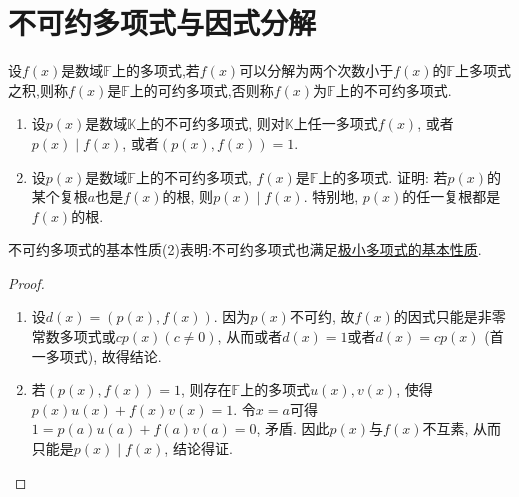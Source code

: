 \documentclass[../../main.tex]{subfiles}
\begin{document}
\section{不可约多项式与因式分解}

\begin{definition}[不可约多项式的定义]\label{definition:不可约多项式的定义}
设\(f(x)\)是数域\(\mathbb{F}\)上的多项式,若\(f(x)\)可以分解为两个次数小于\(f(x)\)的\(\mathbb{F}\)上多项式之积,则称\(f(x)\)是\(\mathbb{F}\)上的可约多项式,否则称\(f(x)\)为\(\mathbb{F}\)上的不可约多项式.
\end{definition}

\begin{proposition}[不可约多项式的基本性质]\label{proposition:不可约多项式的基本性质}
\begin{enumerate}[(1)]
\item 设\(p(x)\)是数域\(\mathbb{K}\)上的不可约多项式, 则对\(\mathbb{K}\)上任一多项式\(f(x)\), 或者\(p(x)\mid f(x)\), 或者\((p(x),f(x)) = 1\).

\item 设\(p(x)\)是数域\(\mathbb{F}\)上的不可约多项式, \(f(x)\)是\(\mathbb{F}\)上的多项式. 证明: 若\(p(x)\)的某个复根\(a\)也是\(f(x)\)的根, 则\(p(x)\mid f(x)\). 特别地, \(p(x)\)的任一复根都是\(f(x)\)的根.
\end{enumerate}
\end{proposition}
\begin{note}
不可约多项式的基本性质(2)表明:不可约多项式也满足\hyperref[proposition:极小多项式的基本性质]{极小多项式的基本性质}.
\end{note}
\begin{proof}
\begin{enumerate}[(1)]
\item 设\(d(x)=(p(x),f(x))\). 因为\(p(x)\)不可约, 故\(f(x)\)的因式只能是非零常数多项式或\(cp(x)(c\neq 0)\), 从而或者\(d(x)=1\)或者\(d(x)=cp(x)\) (首一多项式), 故得结论.

\item 若\((p(x),f(x)) = 1\), 则存在\(\mathbb{F}\)上的多项式\(u(x),v(x)\), 使得\(p(x)u(x)+f(x)v(x)=1\). 令\(x = a\)可得\(1 = p(a)u(a)+f(a)v(a)=0\), 矛盾. 因此\(p(x)\)与\(f(x)\)不互素, 从而只能是\(p(x)\mid f(x)\), 结论得证. 
\end{enumerate}


\end{proof}
\end{document}
